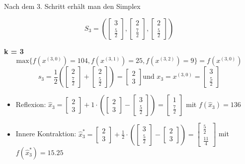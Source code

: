 \documentclass[a4paper, 12pt]{report}
\begin{document}
Nach dem 3. Schritt erhält man den Simplex

$$S_3 = (\begin{bmatrix}3\\\frac{5}{2}\end{bmatrix}, \begin{bmatrix}2\\\frac{7}{2}\end{bmatrix}, \begin{bmatrix}2\\\frac{5}{2}\end{bmatrix})$$

\textbf{k = 3}\\
$$\text{max}\{f(x^{(3,0)}) = 104, f(x^{(3,1)}) = 25, f(x^{(3,2)}) = 9\} = f(x^{(3,0)})$$
$$s_3 = \frac{1}{2}(\begin{bmatrix}2\\\frac{7}{2}\end{bmatrix} + \begin{bmatrix}2\\\frac{5}{2}\end{bmatrix}) = \begin{bmatrix}2\\3\end{bmatrix} \text{und } x_3 = x^{(3,0)} = \begin{bmatrix}3\\\frac{5}{2}\end{bmatrix}$$
\begin{itemize}
\item Reflexion: $\hat x_3 = \begin{bmatrix}2\\3\end{bmatrix} + 1\cdot(\begin{bmatrix}2\\3\end{bmatrix} - \begin{bmatrix}3\\\frac{5}{2}\end{bmatrix}) = \begin{bmatrix}1\\\frac{7}{2}\end{bmatrix}$ mit $f(\hat x_3) = 136$
\item Innere Kontraktion: $\hat x_3^* = \begin{bmatrix}2\\3\end{bmatrix} + \frac{1}{2}\cdot(\begin{bmatrix}3\\\frac{5}{2}\end{bmatrix} - \begin{bmatrix}2\\3\end{bmatrix}) = \begin{bmatrix}\frac{5}{2}\\\frac{11}{4}\end{bmatrix}$ mit $f(\hat x_3^*) = 15.25$
\end{itemize}
\end{document}
